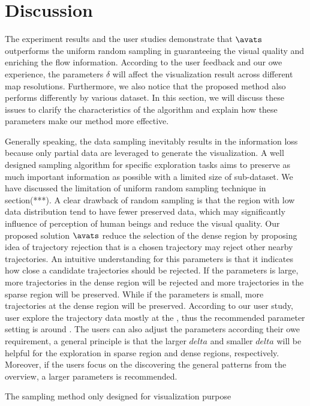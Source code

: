 \section{Discussion}

The experiment results and the user studies demonstrate that $\avats$ outperforms the uniform random sampling in guaranteeing the visual quality and enriching the flow information. According to the user feedback and our owe experience, the parameters $\delta$ will affect the visualization result across different map resolutions. Furthermore, we also notice that the proposed method also performs differently by various dataset. In this section, we will discuss these issues to clarify the characteristics of the algorithm and explain how these parameters make our method more effective.

Generally speaking, the data sampling inevitably results in the information loss because only partial data are leveraged to generate the visualization. A well designed sampling algorithm for specific exploration tasks aims to preserve as much important information as possible with a limited size of sub-dataset. We have discussed the limitation of uniform random sampling technique in section(***). A clear drawback of random sampling is that the region with low data distribution tend to have fewer preserved data, which may significantly influence of perception of human beings and reduce the visual quality. Our proposed solution $\avats$ reduce the selection of the dense region by proposing idea of trajectory rejection that is a chosen trajectory may reject other nearby trajectories. An intuitive understanding for this parameters is that it indicates how close a candidate trajectories should be rejected. If the parameters is large, more trajectories in the dense region will be rejected and more trajectories in the sparse region will be preserved. While if the parameters is small, more trajectories at the dense region will be preserved. According to our user study, user explore the trajectory data mostly at the , thus the recommended parameter setting is around . The users can also adjust the parameters according their owe requirement, a general principle is that the larger $delta$ and smaller $delta$ will be helpful for the exploration in sparse region and dense regions, respectively. Moreover, if the users focus on the discovering the general patterns from the overview, a larger parameters is recommended.


The sampling method only designed for visualization purpose